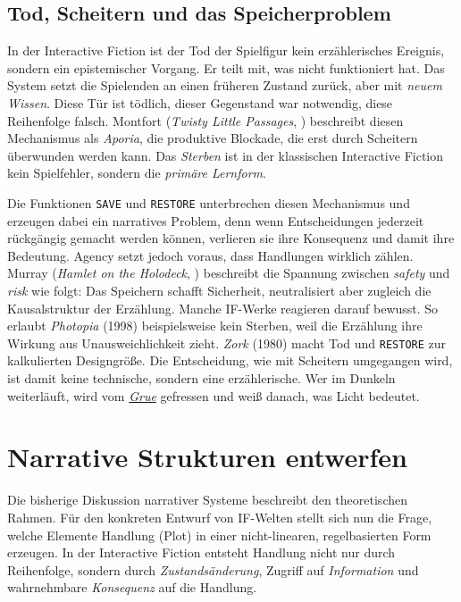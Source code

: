 \documentclass[parskip=half,a4paper,11pt]{scrreprt}
\begin{document}
\subsection{Tod, Scheitern und das Speicherproblem}

In der Interactive Fiction ist der Tod der Spielfigur kein erzählerisches Ereignis, sondern ein epistemischer Vorgang. Er teilt mit, was nicht funktioniert hat. Das System setzt die Spielenden an einen früheren Zustand zurück, aber mit \textit{neuem Wissen}. Diese Tür ist tödlich, dieser Gegenstand war notwendig, diese Reihenfolge falsch. Montfort (\textit{Twisty Little Passages}, \citep{Montfort2003}) beschreibt diesen Mechanismus als \textit{Aporia}, die produktive Blockade, die erst durch Scheitern überwunden werden kann. Das \textit{Sterben} ist in der klassischen Interactive Fiction kein Spielfehler, sondern die \textit{primäre Lernform}.

Die Funktionen \texttt{SAVE} und \texttt{RESTORE} unterbrechen diesen Mechanismus und erzeugen dabei ein narratives Problem, denn wenn Entscheidungen jederzeit rückgängig gemacht werden können, verlieren sie ihre Konsequenz und damit ihre Bedeutung. Agency setzt jedoch voraus, dass Handlungen wirklich zählen. Murray (\textit{Hamlet on the Holodeck}, \citep{Murray1997}) beschreibt die Spannung zwischen \textit{safety} und \textit{risk} wie folgt: Das Speichern schafft Sicherheit, neutralisiert aber zugleich die Kausalstruktur der Erzählung. Manche IF-Werke reagieren darauf bewusst. So erlaubt \textit{Photopia} (1998) beispielsweise kein Sterben, weil die Erzählung ihre Wirkung aus Unausweichlichkeit zieht. \textit{Zork} (1980) macht Tod und \texttt{RESTORE}  zur kalkulierten Designgröße. Die Entscheidung, wie mit Scheitern umgegangen wird, ist damit keine technische, sondern eine erzählerische. Wer im Dunkeln weiterläuft, wird vom \textit{\href{https://zork.fandom.com/wiki/Grue}{Grue}} gefressen und weiß danach, was Licht bedeutet.

\section{Narrative Strukturen entwerfen}

Die bisherige Diskussion narrativer Systeme beschreibt den theoretischen Rahmen. Für den konkreten Entwurf von IF-Welten stellt sich nun die Frage, welche Elemente Handlung (Plot) in einer nicht-linearen, regelbasierten Form erzeugen. In der Interactive Fiction entsteht Handlung nicht nur durch Reihenfolge, sondern durch \textit{Zustandsänderung}, Zugriff auf\textit{ Information} und wahrnehmbare \textit{Konsequenz} auf die Handlung.
\end{document}
